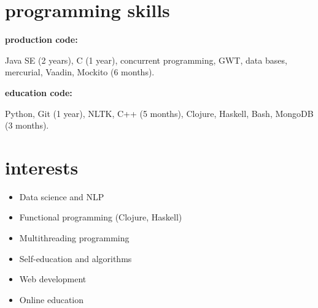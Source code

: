 \documentclass[]{friggeri-cv} %
\begin{document}
\section{programming skills}
\textbf{production code:}

Java SE (2 years), C (1 year), concurrent programming, GWT,
data bases, mercurial, Vaadin, Mockito (6 months).

\textbf{education code:}

Python, Git (1 year), NLTK, C++ (5 months), Clojure, Haskell, Bash, MongoDB (3 months).

\section{interests}
\begin{multicols}{2}

\begin{itemize}
  \item Data science and NLP
  \item Functional programming (Clojure, Haskell)
  \item Multithreading programming
  \item Self-education and algorithms
  \item Web development
  \item Online education
\end{itemize}
\end{multicols}

\end{document}
